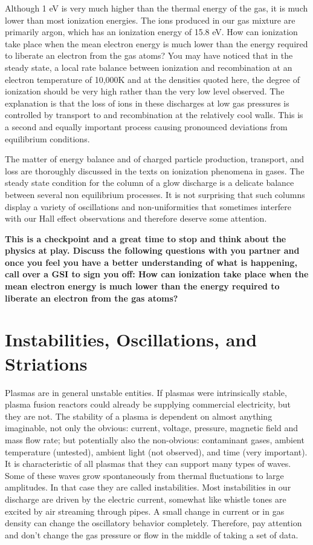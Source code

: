 \documentclass{../lab}
\begin{document}
Although 1 eV is very much higher than the thermal energy of the gas, it is much lower than most ionization energies. The ions produced in our gas mixture are primarily argon, which has an ionization energy of 15.8 eV. How can ionization take place when the mean electron energy is much lower than the energy required to liberate an electron from the gas atoms? You may have noticed that in the steady state, a local rate balance between ionization and recombination at an electron temperature of 10,000K and at the densities quoted here, the degree of ionization should be very high rather than the very low level observed. The explanation is that the loss of ions in these discharges at low gas pressures is controlled by transport to and recombination at the relatively cool walls. This is a second and equally important process causing pronounced deviations from equilibrium conditions.

The matter of energy balance and of charged particle production, transport, and loss are thoroughly discussed in the texts on ionization phenomena in gases. The steady state condition for the column of a glow discharge is a delicate balance between several non equilibrium processes. It is not surprising that such columns display a variety of oscillations and non-uniformities that sometimes interfere with our Hall effect observations and therefore deserve some attention.

\textbf{This is a checkpoint and a great time to stop and think about the physics at play. Discuss the following questions with you partner and once you feel you have a better understanding of what is happening, call over a GSI to sign you off:
How can ionization take place when the mean electron energy is much lower than the energy required to liberate an electron from the gas atoms?}

\section{Instabilities, Oscillations, and Striations}

Plasmas are in general unstable entities. If plasmas were intrinsically stable, plasma fusion reactors could already be supplying commercial electricity, but they are not. The stability of a plasma is dependent on almost anything imaginable, not only the obvious: current, voltage, pressure, magnetic field and mass flow rate; but potentially also the non-obvious: contaminant gases, ambient temperature (untested), ambient light (not observed), and time (very important). It is characteristic of all plasmas that they can support many types of waves. Some of these waves grow spontaneously from thermal fluctuations to large amplitudes. In that case they are called instabilities. Most instabilities in our discharge are driven by the electric current, somewhat like whistle tones are excited by air streaming through pipes. A small change in current or in gas density can change the oscillatory behavior completely. Therefore, pay attention and don’t change the gas pressure or flow in the middle of taking a set of data.
\end{document}
